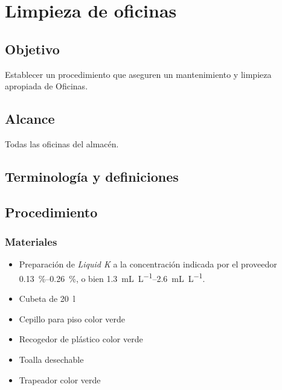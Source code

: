 \thispagestyle{formato-PI}
\renewcommand{\MenorVer}{0}
\renewcommand{\MayorVer}{2}
\renewcommand{\Codigo}{HYS-14-IT}
\renewcommand{\FechaPub}{2023--01}
\renewcommand{\Titulo}{Limpieza de oficinas}

\section{\Titulo}

\subsection{Objetivo}
Establecer un procedimiento que aseguren un mantenimiento y limpieza apropiada de Oficinas.

\subsection{Alcance}
Todas las oficinas del almacén.

\subsection{Terminología y definiciones}
\begin{description}
\end{description}

\subsection{Procedimiento}
\subsubsection{Materiales}
\begin{itemize}
	\item Preparación de \emph{Liquid K} a la concentración indicada por el proveedor \qtyrange{.13}{.26}{\percent}, o bien \qtyrange{1.3}{2.6}{\milli\liter\per\liter}.
	\item Cubeta de \qty{20}{\litre}
	\item Cepillo para piso color verde
	\item Recogedor de plástico color verde
	\item Toalla desechable
	\item Trapeador color verde
\end{itemize}

